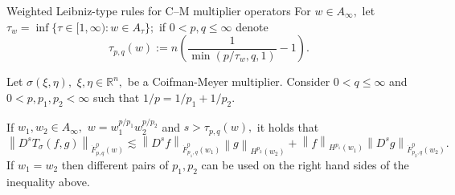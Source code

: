 \documentclass[xcolor=dvipsnames]{beamer}
\newcommand{\re}{\mathbb{R}}
\newcommand{\rn}{{{\mathbb R}^n}}
\newcommand{\abs}[1]{\vert #1 \vert}
\newcommand{\norm}[2]{{\left\| #1 \right\|}_{#2}}
\newcommand{\sw}{{\mathcal{S}}(\rn)}
\newcommand{\dx}{\, dx}
\newcommand{\tlw}[4]{\dot F_{#1,#3}^{#2}(#4)} %
\newcommand{\hcline}{1/p=1/p_1+1/p_2}
\begin{document}
%



\begin{frame}{Weighted Leibniz-type rules for C--M multiplier operators}
For $w\in A_\infty,$  let $\tau_w=\inf\{\tau\in [1,\infty): w\in A_\tau\};$ if  $0<p,q\le \infty$ denote 
\begin{equation*}
\tau_{p,q}(w) := n \left(\frac{1}{\min(p/\tau_w,q,1)} - 1 \right).
\end{equation*} 

\begin{theorem}[Naibo--T., 2018]\label{thm:CM:TL:B}  
Let $\sigma(\xi,\eta),$ $\xi,\eta\in\rn,$ be a Coifman-Meyer multiplier. Consider  $0 < q \leq \infty$ and $0 < p, p_1, p_2  < \infty$  such that $\hcline.$ 

\medskip

If  $w_1,w_2\in A_\infty,$ $w=w_1^{{p}/{p_1}} w_2^{{p}/{p_2}}$  and  $s > \tau_{p,q}(w),$  it holds that
\begin{equation*}
\norm{D^s T_\sigma(f,g)}{\tlw{p}{0}{q}{w}} \lesssim \norm{D^s f}{\tlw{p_1}{0}{q}{w_1} } \norm{g}{H^{p_2}(w_2)} +  \norm{f}{H^{p_1}(w_1)}   \norm{D^s g}{\tlw{p_2}{0}{q}{w_2} }.
\end{equation*}
If $w_1=w_2$ then different pairs of $p_1, p_2$ can be used on the right hand sides of the inequality above.
\end{theorem}
\end{frame}
\end{document}
